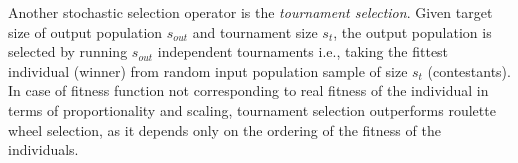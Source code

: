 Another stochastic selection operator is the \emph{tournament selection}. Given target size of output population $s_{out}$ and tournament size $s_t$, the output population is selected by running $s_{out}$ independent tournaments i.e., taking the fittest individual (winner) from random input population sample of size $s_t$ (contestants). In case of fitness function not corresponding to real fitness of the individual in terms of proportionality and scaling, tournament selection outperforms roulette wheel selection, as it depends only on the ordering of the fitness of the individuals.
